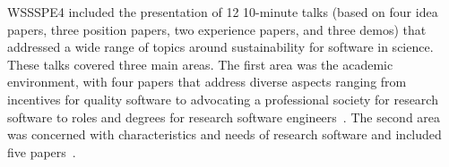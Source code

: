 \documentclass[11pt, oneside]{amsart}
\newcommand{\note}[1]{ {\textcolor{blueish}    { ***Note:      #1 }}}
\begin{document}


WSSSPE4 included the presentation of 12 10-minute talks (based on four idea papers, three position papers,
two experience papers, and three demos) that addressed a wide range of topics around
sustainability for software in science. These talks covered three main areas.
%
The first area was the academic environment, with four papers
that address diverse aspects ranging from incentives for quality software to
advocating a professional society for research software to roles and degrees for
research software engineers~\cite{Heroux:2016ws, GAllen:2016ws, Philippe:2016ws, Gwilliams:2016ws}.
The second area was concerned with characteristics and needs of
research software and included five papers~\cite{Dubey1:2016ws, ChueHong:2016ws, Dubey2:2016ws, Queiroz:2016ws, Childers:2016ws}.
\end{document}
